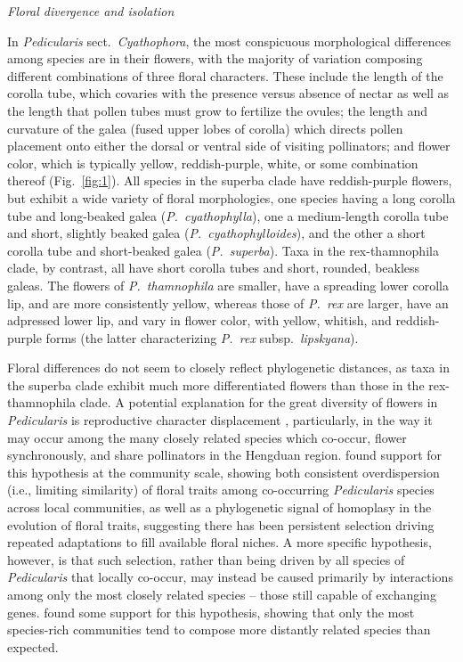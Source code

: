 \documentclass[12pt,letterpaper]{article}
\renewcommand{\subsection}[1]{%
\bigskip
\begin{center}
\begin{large}
\normalfont\itshape #1
\end{large}
\end{center}}
\begin{document}
\subsection{Floral divergence and isolation}
In \emph{Pedicularis} sect.\ \emph{Cyathophora}, the most conspicuous
morphological differences among species are in their flowers, with the
majority of variation composing different combinations of three floral
characters. These include the length of the corolla tube, which
covaries with the presence versus absence of nectar as well as the
length that pollen tubes must grow to fertilize the ovules; the length
and curvature of the galea (fused upper lobes of corolla) which
directs pollen placement onto either the dorsal or ventral side of
visiting pollinators; and flower color, which is typically yellow,
reddish-purple, white, or some combination thereof
(Fig.~\ref{fig:1}). All species in the superba clade have
reddish-purple flowers, but exhibit a wide variety of floral
morphologies, one species having a long corolla tube and long-beaked
galea (\emph{P.~cyathophylla}), one a medium-length corolla tube and
short, slightly beaked galea (\emph{P.~cyathophylloides}), and the
other a short corolla tube and short-beaked galea (\emph{P.~superba}).
Taxa in the rex-thamnophila clade, by contrast, all have short corolla
tubes and short, rounded, beakless galeas.  The flowers of
\emph{P.~thamnophila} are smaller, have a spreading lower corolla lip,
and are more consistently yellow, whereas those of \emph{P.~rex} are
larger, have an adpressed lower lip, and vary in flower color, with
yellow, whitish, and reddish-purple forms (the latter characterizing
\emph{P.~rex} subsp.\ \emph{lipskyana}).

Floral differences do not seem to closely reflect phylogenetic
distances, as taxa in the superba clade exhibit much more
differentiated flowers than those in the rex-thamnophila clade.  A
potential explanation for the great diversity of flowers in
\emph{Pedicularis} is reproductive character displacement
\citep{armbruster_floral_1994}, particularly, in the way it may occur
among the many closely related species which co-occur, flower
synchronously, and share pollinators in the Hengduan region.
\cite{eaton_floral_2012} found support for this hypothesis at the
community scale, showing both consistent overdispersion (i.e.,
limiting similarity) of floral traits among co-occurring
\emph{Pedicularis} species across local communities, as well as a
phylogenetic signal of homoplasy in the evolution of floral traits,
suggesting there has been persistent selection driving repeated
adaptations to fill available floral niches.  A more specific
hypothesis, however, is that such selection, rather than being driven
by all species of \emph{Pedicularis} that locally co-occur, may
instead be caused primarily by interactions among only the most
closely related species -- those still capable of exchanging genes.
\cite{eaton_floral_2012} found some support for this hypothesis,
showing that only the most species-rich communities tend to compose
more distantly related species than expected.
\end{document}

